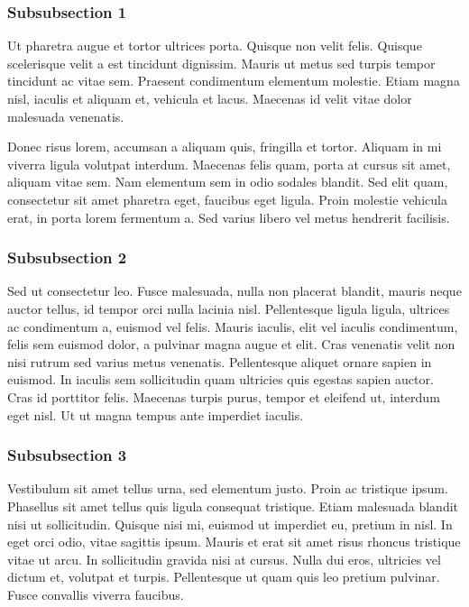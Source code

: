 \subsubsection{Subsubsection 1}

Ut pharetra augue et tortor ultrices porta. Quisque non velit felis. Quisque scelerisque velit a est tincidunt
dignissim. Mauris ut metus sed turpis tempor tincidunt ac vitae sem. Praesent condimentum elementum molestie. Etiam
magna nisl, iaculis et aliquam et, vehicula et lacus. Maecenas id velit vitae dolor malesuada venenatis.

Donec risus lorem, accumsan a aliquam quis, fringilla et tortor. Aliquam in mi viverra ligula volutpat interdum.
Maecenas felis quam, porta at cursus sit amet, aliquam vitae sem. Nam elementum sem in odio sodales blandit. Sed elit
quam, consectetur sit amet pharetra eget, faucibus eget ligula. Proin molestie vehicula erat, in porta lorem fermentum
a. Sed varius libero vel metus hendrerit facilisis.

\subsubsection{Subsubsection 2}
Sed ut consectetur leo. Fusce malesuada, nulla non placerat blandit, mauris neque auctor tellus, id tempor orci nulla
lacinia nisl. Pellentesque ligula ligula, ultrices ac condimentum a, euismod vel felis. Mauris iaculis, elit vel iaculis
condimentum, felis sem euismod dolor, a pulvinar magna augue et elit. Cras venenatis velit non nisi rutrum sed varius
metus venenatis. Pellentesque aliquet ornare sapien in euismod. In iaculis sem sollicitudin quam ultricies quis egestas
sapien auctor. Cras id porttitor felis. Maecenas turpis purus, tempor et eleifend ut, interdum eget nisl. Ut ut magna
tempus ante imperdiet iaculis.

\subsubsection{Subsubsection 3}
Vestibulum sit amet tellus urna, sed elementum justo. Proin ac tristique ipsum. Phasellus sit amet tellus quis ligula
consequat tristique. Etiam malesuada blandit nisi ut sollicitudin. Quisque nisi mi, euismod ut imperdiet eu, pretium in
nisl. In eget orci odio, vitae sagittis ipsum. Mauris et erat sit amet risus rhoncus tristique vitae ut arcu. In
sollicitudin gravida nisi at cursus. Nulla dui eros, ultricies vel dictum et, volutpat et turpis. Pellentesque ut quam
quis leo pretium pulvinar. Fusce convallis viverra faucibus.

